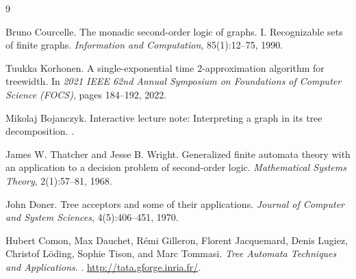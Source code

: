 \documentclass[11pt]{article}
\theoremstyle{definition}
\begin{document}
\begin{thebibliography}{9}

Bruno Courcelle.
\newblock The monadic second-order logic of graphs. I. Recognizable sets of
finite graphs.
\newblock \emph{Information and Computation}, 85(1):12--75, 1990.

Tuukka Korhonen.
\newblock A single-exponential time 2-approximation algorithm for treewidth.
\newblock In \emph{2021 IEEE 62nd Annual Symposium on Foundations of Computer
Science (FOCS)}, pages 184--192, 2022.

Mikolaj Bojanczyk.
\newblock Interactive lecture note: Interpreting a graph in its tree decomposition.
.

James W. Thatcher and Jesse B. Wright.
\newblock Generalized finite automata theory with an application to a decision
problem of second-order logic.
\newblock \emph{Mathematical Systems Theory}, 2(1):57--81, 1968.

John Doner.
\newblock Tree acceptors and some of their applications.
\newblock \emph{Journal of Computer and System Sciences}, 4(5):406--451, 1970.

Hubert Comon, Max Dauchet, R\'emi Gilleron, Florent Jacquemard, Denis Lugiez,
Christof L\"oding, Sophie Tison, and Marc Tommasi.
\newblock \emph{Tree Automata Techniques and Applications}.
. \url{http://tata.gforge.inria.fr/}.

\end{thebibliography}
\end{document}
